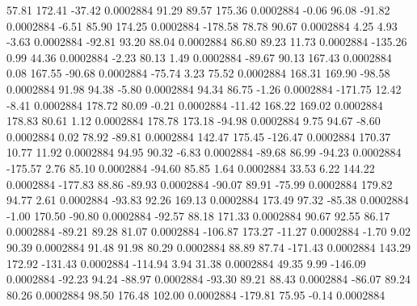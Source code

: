        57.81      172.41      -37.42     0.0002884
       91.29       89.57      175.36     0.0002884
       -0.06       96.08      -91.82     0.0002884
       -6.51       85.90      174.25     0.0002884
     -178.58       78.78       90.67     0.0002884
        4.25        4.93       -3.63     0.0002884
      -92.81       93.20       88.04     0.0002884
       86.80       89.23       11.73     0.0002884
     -135.26        0.99       44.36     0.0002884
       -2.23       80.13        1.49     0.0002884
      -89.67       90.13      167.43     0.0002884
        0.08      167.55      -90.68     0.0002884
      -75.74        3.23       75.52     0.0002884
      168.31      169.90      -98.58     0.0002884
       91.98       94.38       -5.80     0.0002884
       94.34       86.75       -1.26     0.0002884
     -171.75       12.42       -8.41     0.0002884
      178.72       80.09       -0.21     0.0002884
      -11.42      168.22      169.02     0.0002884
      178.83       80.61        1.12     0.0002884
      178.78      173.18      -94.98     0.0002884
        9.75       94.67       -8.60     0.0002884
        0.02       78.92      -89.81     0.0002884
      142.47      175.45     -126.47     0.0002884
      170.37       10.77       11.92     0.0002884
       94.95       90.32       -6.83     0.0002884
      -89.68       86.99      -94.23     0.0002884
     -175.57        2.76       85.10     0.0002884
      -94.60       85.85        1.64     0.0002884
       33.53        6.22      144.22     0.0002884
     -177.83       88.86      -89.93     0.0002884
      -90.07       89.91      -75.99     0.0002884
      179.82       94.77        2.61     0.0002884
      -93.83       92.26      169.13     0.0002884
      173.49       97.32      -85.38     0.0002884
       -1.00      170.50      -90.80     0.0002884
      -92.57       88.18      171.33     0.0002884
       90.67       92.55       86.17     0.0002884
      -89.21       89.28       81.07     0.0002884
     -106.87      173.27      -11.27     0.0002884
       -1.70        9.02       90.39     0.0002884
       91.48       91.98       80.29     0.0002884
       88.89       87.74     -171.43     0.0002884
      143.29      172.92     -131.43     0.0002884
     -114.94        3.94       31.38     0.0002884
       49.35        9.99     -146.09     0.0002884
      -92.23       94.24      -88.97     0.0002884
      -93.30       89.21       88.43     0.0002884
      -86.07       89.24       80.26     0.0002884
       98.50      176.48      102.00     0.0002884
     -179.81       75.95       -0.14     0.0002884
